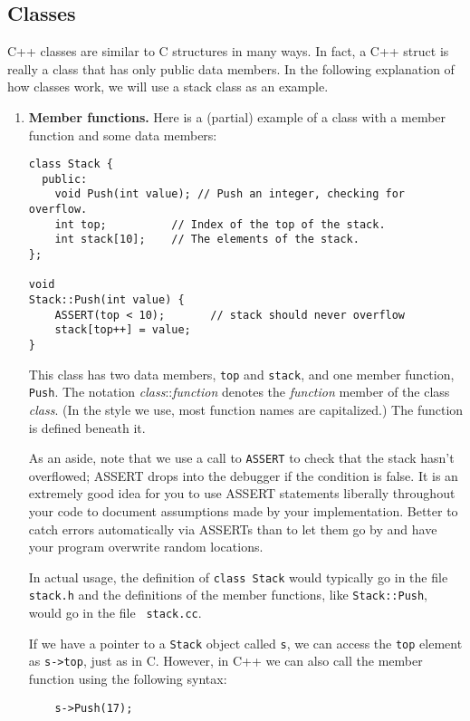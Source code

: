 \subsection{Classes}

C++ classes are similar to C structures in many ways.  In fact, a C++
struct is really a class that has only public data members.
In the following explanation of how classes work, we will use a stack
class as an example.

\begin{enumerate}
\item {\bf Member functions.}   Here is a (partial) example of a class
with a member function and some data members:
\begin{verbatim}
class Stack {
  public:
    void Push(int value); // Push an integer, checking for overflow.
    int top;          // Index of the top of the stack.
    int stack[10];    // The elements of the stack.
};

void
Stack::Push(int value) {
    ASSERT(top < 10);		// stack should never overflow
    stack[top++] = value;
}
\end{verbatim}

This class has two data members, {\tt top} and {\tt stack}, and one
member function, {\tt Push}.
The notation {\em class}::{\em function} denotes the
{\em function} member of the class {\em class}.  (In the style we use,
most function names are capitalized.)  The function is defined beneath
it.

As an aside, note that we use a call to {\tt ASSERT} to check that
the stack hasn't overflowed; ASSERT drops into the debugger if the condition
is false.  It is an extremely good idea for you to use ASSERT
statements liberally throughout your code to document assumptions
made by your implementation.  Better to catch errors automatically
via ASSERTs than to let them go by and have your program overwrite
random locations.

In actual usage, the definition of {\tt class Stack} would typically
go in the file {\tt stack.h} and the definitions of the member
functions, like {\tt Stack::Push}, would go in the file {\tt
stack.cc}.

If we have a pointer to a {\tt Stack} object called {\tt s}, we can
access the {\tt top} element as {\tt s->top}, just as in C.  However,
in C++ we can also call the member function using the following syntax:

\begin{verbatim}
    s->Push(17);
\end{verbatim}


\end{enumerate}

